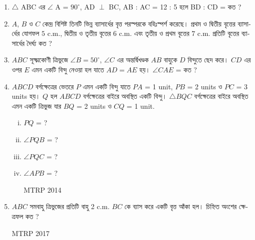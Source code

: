 \documentclass[11pt, a4paper]{article}
\begin{document}
\begin{enumerate}
	 \item $\bigtriangleup$ ABC \textbengali{এর} $\angle$ A = $90^{\circ}$, AD $\perp$ BC, AB : AC = 12 : 5 \textbengali{হলে} BD : CD = \textbengali{কত} ?
	 
	 \item $A$, $B$ \textbengali{ও} $C$ \textbengali{কেন্দ্র বিশিষ্ট তিনটি ভিন্ন ব্যাসার্ধের বৃত্ত পরস্পরকে বহিঃস্পর্শ করেছে। প্রথম ও দ্বিতীয় বৃত্তের ব্যাসার্ধের যোগফল} $5$ c.m., \textbengali{দ্বিতীয় ও তৃতীয় বৃত্তের} $6$ c.m. \textbengali{এবং তৃতীয় ও প্রথম বৃত্তের} $7$ c.m. \textbengali{প্রতিটি বৃত্তের ব্যাসার্ধের দৈর্ঘ্য কত ?}
	 
	 
	 \item $ABC$ \textbengali{সূক্ষ্মকোণী ত্রিভুজে}  $\angle B = 50^{\circ}$, $\angle C$ \textbengali{এর অন্তর্দ্বিখণ্ডক} $AB$ \textbengali{বাহুকে} $D$ \textbengali{বিন্দুতে ছেদ করে।} $CD$ \textbengali{এর ওপর} $E$ \textbengali{এমন একটি বিন্দু নেওয়া হল যাতে} $AD = AE$ \textbengali{হয়।} $\angle CAE$ = \textbengali{কত ?}
	 
	 \item $ABCD$ \textbengali{বর্গক্ষেত্রের ভেতরে} $P$ \textbengali{এমন একটি বিন্দু যাতে} $PA$ = 1 unit, $PB$ = 2 units \textbengali{ও} $PC$ = 3 units \textbengali{হয়।} $Q$ \textbengali{হল} $ABCD$ \textbengali{বর্গক্ষেত্রের বাইরে অবস্থিত একটি বিন্দু।} $\bigtriangleup BQC$ \textbengali{বর্গক্ষেত্রের বাইরে অবস্থিত এমন একটি ত্রিভুজ যার} $BQ$ = 2 units \textbengali{ও} $CQ$ = 1 unit.
	 	\begin{enumerate}[(i)]
	 		\item $PQ$ = ?
	 		\item $ \angle PQB $ = ?
	 		\item $ \angle PQC $ = ?
	 		\item $ \angle APB $ = ? 
	 		\begin{flushright}
	 			MTRP 2014
			\end{flushright}	 		 
	 	\end{enumerate}
	 	
	 
	 \item $ABC$ \textbengali{সমবাহু ত্রিভুজের প্রতিটি বাহু} 2 c.m. $BC$ \textbengali{কে ব্যাস করে একটি বৃত্ত আঁকা হল। চিহ্নিত অংশের ক্ষেত্রফল কত ?} 		\begin{flushright}
	 MTRP 2017
\end{flushright}	  
	 

\end{enumerate}
\end{document}
